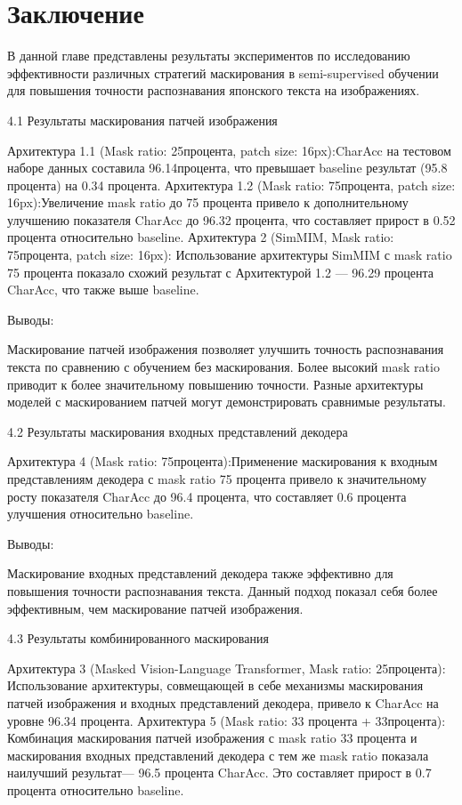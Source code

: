 \section{Заключение}
\label{sec:Chapter5} 

В данной главе представлены результаты экспериментов по исследованию эффективности различных стратегий маскирования в semi-supervised обучении для повышения точности распознавания японского текста на изображениях.  

 4.1 Результаты  маскирования патчей изображения 

Архитектура 1.1 (Mask ratio: 25процента, patch size: 16px):CharAcc на тестовом наборе данных составила 96.14процента, что  превышает  baseline результат (95.8 процента) на 0.34 процента. 
Архитектура 1.2 (Mask ratio: 75процента, patch size: 16px):Увеличение mask ratio  до 75 процента  привело к дополнительному  улучшению  показателя  CharAcc  до 96.32 процента, что  составляет  прирост  в 0.52 процента относительно  baseline.
Архитектура 2 (SimMIM, Mask ratio: 75процента, patch size: 16px): Использование  архитектуры  SimMIM  с  mask ratio 75 процента  показало  схожий  результат  с  Архитектурой  1.2 —  96.29 процента  CharAcc,  что  также  выше  baseline.

Выводы:

Маскирование патчей изображения  позволяет  улучшить  точность  распознавания  текста по  сравнению  с  обучением  без  маскирования.
Более  высокий  mask ratio  приводит  к  более  значительному  повышению  точности. 
Разные  архитектуры  моделей  с  маскированием  патчей  могут  демонстрировать  сравнимые  результаты.

 4.2 Результаты  маскирования  входных  представлений  декодера

Архитектура 4 (Mask ratio: 75процента):Применение маскирования  к  входным  представлениям  декодера  с  mask ratio 75 процента  привело к  значительному  росту  показателя  CharAcc  до 96.4 процента,  что  составляет  0.6 процента улучшения  относительно  baseline.

Выводы:

Маскирование  входных  представлений  декодера  также  эффективно  для  повышения  точности  распознавания  текста.
Данный  подход  показал  себя  более  эффективным,  чем  маскирование  патчей  изображения.

 4.3 Результаты  комбинированного  маскирования

Архитектура 3 (Masked Vision-Language Transformer, Mask ratio: 25процента): Использование  архитектуры,  совмещающей  в  себе  механизмы  маскирования  патчей  изображения  и  входных  представлений  декодера,  привело  к  CharAcc  на  уровне  96.34 процента.
Архитектура 5 (Mask ratio: 33 процента + 33процента): Комбинация  маскирования  патчей  изображения  с  mask ratio 33 процента  и  маскирования  входных  представлений  декодера  с  тем  же  mask ratio  показала  наилучший  результат—  96.5 процента  CharAcc.  Это  составляет  прирост  в  0.7 процента относительно  baseline.

